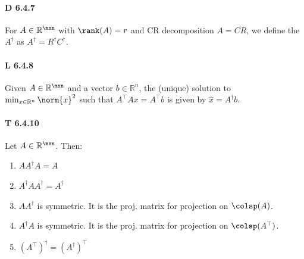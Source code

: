 \paragraph{D 6.4.7} For $A\in\mathbb{R}^{\mxn}$ with $\rank(A)=r$ and CR
decomposition $A=CR$, we define the  $A^\dag$ as $A^\dag=R^\dag C^\dag$.

\paragraph{L 6.4.8} Given $A\in\mathbb{R}^{\mxn}$ and a vector
$b\in\mathbb{R}^n$, the (unique) solution to $\min_{x\in\mathbb{R}^n}\norm{x}^2$
such that $A^\top Ax=A^\top b$ is given by $\hat{x}=A^\dag b$.

\paragraph{T 6.4.10} Let $A\in\mathbb{R}^{\mxn}$. Then:
\begin{enumerate}
    \item $AA^\dag A=A$

    \item $A^\dag AA^\dag=A^\dag$

    \item $AA^\dag$ is symmetric. It is the proj. matrix for projection on
        $\colsp(A)$.

    \item $A^\dag A$ is symmetric. It is the proj. matrix for projection
        on $\colsp(A^\top)$.

    \item $\left(A^\top\right)^\dag = \left(A^\dag\right)^\top$
\end{enumerate}

